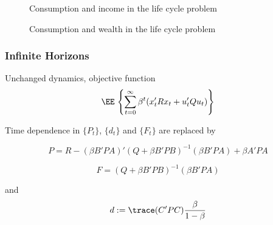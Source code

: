 \begin{frame}
    
    \begin{figure}
        \centering
        \caption{\label{f:lqcontrol1} Consumption and income in the life cycle problem}
    \end{figure}

\end{frame}


\begin{frame}
    
    \begin{figure}
        \centering
        \caption{\label{f:lqcontrol2} Consumption and wealth in the life cycle problem}
    \end{figure}

\end{frame}






\begin{frame}
    \frametitle{Infinite Horizons}
    
    Unchanged dynamics, objective function 
    \begin{equation*}
        \label{eq:lq_object_ih}
        \EE \,
        \left\{
            \sum_{t=0}^{\infty} \beta^t (x_t' R x_t + u_t' Q u_t )
        \right\}
    \end{equation*}


    Time dependence in $\{P_t\}$, $\{d_t\}$ and $\{F_t\}$ are replaced by

    \begin{equation*}
        P
        = R - (\beta B' P A)' (Q + \beta B' P B)^{-1} (\beta B' P A)
        + \beta A' P A
    \end{equation*}

    \begin{equation*}
        F = (Q + \beta B' P B)^{-1} (\beta B' P A )
    \end{equation*}

    and
    \begin{equation*}
        d := \trace(C' P C) \frac{\beta}{1 - \beta}
    \end{equation*}

\end{frame}


